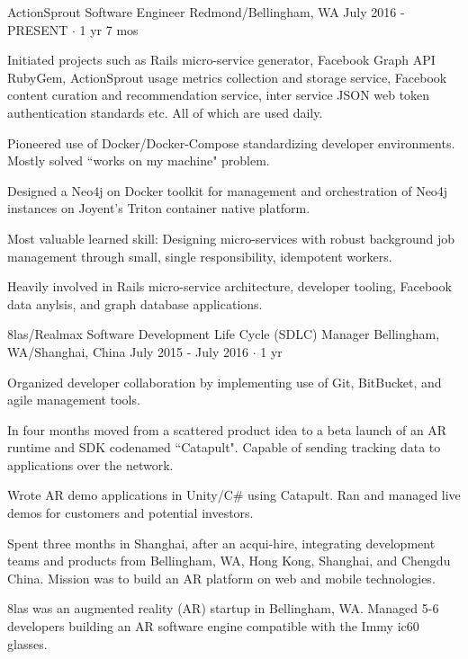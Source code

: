 \documentclass[11pt, a4paper]{awesome-cv}
\begin{document}
\begin{cventries}
  \cventry
    {ActionSprout} %
    {Software Engineer} %
    {Redmond/Bellingham, WA} %
    {July 2016 - PRESENT $\cdot$ 1 yr 7 mos} %
    {
      \begin{cvitems} %
        \item Initiated projects such as Rails micro-service generator, Facebook Graph API RubyGem, ActionSprout usage metrics collection and storage service, Facebook content curation and recommendation service, inter service JSON web token authentication standards etc. All of which are used daily.
        \item Pioneered use of Docker/Docker-Compose standardizing developer environments. Mostly solved ``works on my machine" problem.
        \item Designed a Neo4j on Docker toolkit for management and orchestration of Neo4j instances on Joyent's Triton container native platform.
        \item Most valuable learned skill: Designing micro-services with robust background job management through small, single responsibility, idempotent workers.
      \end{cvitems}
    }
    {
      Heavily involved in Rails micro-service architecture, developer tooling, Facebook data anylsis, and graph database applications.
    }

  \cventry
    {8las/Realmax} %
    {Software Development Life Cycle (SDLC) Manager} %
    {Bellingham, WA/Shanghai, China} %
    {July 2015 - July 2016 $\cdot$ 1 yr} %
    {
      \begin{cvitems} %
        \item Organized developer collaboration by implementing use of Git, BitBucket, and agile management tools.
        \item In four months moved from a scattered product idea to a beta launch of an AR runtime and SDK codenamed ``Catapult". Capable of sending tracking data to applications over the network.
        \item Wrote AR demo applications in Unity/C\# using Catapult. Ran and managed live demos for customers and potential investors.
        \item Spent three months in Shanghai, after an acqui-hire, integrating development teams and products from Bellingham, WA, Hong Kong, Shanghai, and Chengdu China. Mission was to build an AR platform on web and mobile technologies.
      \end{cvitems}
    }
    {
      8las was an augmented reality (AR) startup in Bellingham, WA. Managed 5-6 developers building an AR software engine compatible with the Immy ic60 glasses.
    }


\end{cventries}
\end{document}
